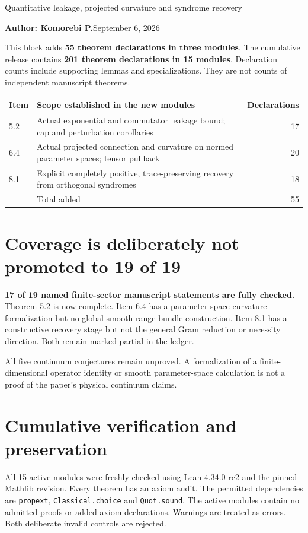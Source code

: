\documentclass[10pt,letterpaper]{article}
\newcommand{\pageheading}[2]{\vspace*{2pt}{\small\color{ink}\textsc{#1}}\par\vspace{2pt}{\Large\bfseries #2}\par\vspace{4pt}}
\begin{document}
\pageheading{Release record}{Fourth checked proof block}
{\large Quantitative leakage, projected curvature and syndrome recovery}\par
\textbf{Author: Komorebi P.}\hfill September 6, 2026

This block adds \textbf{55 theorem declarations in three modules}. The cumulative release contains \textbf{201 theorem declarations in 15 modules}. Declaration counts include supporting lemmas and specializations. They are not counts of independent manuscript theorems.

\begin{center}
\renewcommand{\arraystretch}{1.25}
\begin{tabularx}{\linewidth}{@{}lXr@{}}
\toprule
Item & Scope established in the new modules & Declarations\\
\midrule
5.2 & Actual exponential and commutator leakage bound; cap and perturbation corollaries & 17\\
6.4 & Actual projected connection and curvature on normed parameter spaces; tensor pullback & 20\\
8.1 & Explicit completely positive, trace-preserving recovery from orthogonal syndromes & 18\\
\midrule
& Total added & 55\\
\bottomrule
\end{tabularx}
\end{center}

\section*{Coverage is deliberately not promoted to 19 of 19}
\textbf{17 of 19 named finite-sector manuscript statements are fully checked.} Theorem 5.2 is now complete. Item 6.4 has a parameter-space curvature formalization but no global smooth range-bundle construction. Item 8.1 has a constructive recovery stage but not the general Gram reduction or necessity direction. Both remain marked partial in the ledger.

All five continuum conjectures remain unproved. A formalization of a finite-dimensional operator identity or smooth parameter-space calculation is not a proof of the paper's physical continuum claims.

\section*{Cumulative verification and preservation}
All 15 active modules were freshly checked using Lean 4.34.0-rc2 and the pinned Mathlib revision. Every theorem has an axiom audit. The permitted dependencies are \texttt{propext}, \texttt{Classical.choice} and \texttt{Quot.sound}. The active modules contain no admitted proofs or added axiom declarations. Warnings are treated as errors. Both deliberate invalid controls are rejected.
\end{document}
